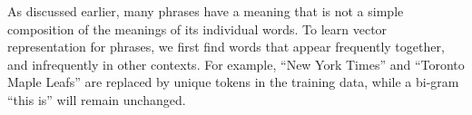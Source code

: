 {As discussed earlier, many phrases have a meaning that is not a simple composition of the meanings of its individual words. To learn vector representation for phrases, we first find words that appear frequently together, and infrequently in other contexts. For example, “New York Times” and “Toronto Maple Leafs” are replaced by unique tokens in the training data, while a bi-gram “this is” will remain unchanged.
\cite[p5]{mikolov_distributed_2013} 
}
